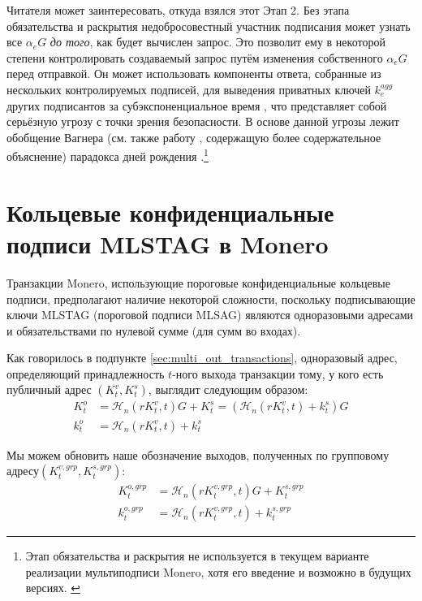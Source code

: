 Читателя может заинтересовать, откуда взялся этот Этап 2. Без этапа обязательства и раскрытия \cite{MRL-0009-multisig} недобросовестный участник подписания может узнать все $\alpha_e G$ {\em до того}, как будет вычислен запрос. Это позволит ему в некоторой степени контролировать создаваемый запрос путём изменения собственного $\alpha_e G$ перед отправкой. Он может использовать компо\-ненты ответа, собранные из нескольких контролируемых подписей, для выведения приватных ключей $k^{agg}_e$ других подписантов за субэкспоненциальное время \cite{cryptoeprint:2018:417}, что представляет собой серьёзную угрозу с точки зрения безопасности. В основе данной угрозы лежит обобщение Вагнера \cite{generalized-birthday-wagner} (см. также работу \cite{adam-wagnerian-tragedies}, содержащую более содержательное объяснение) пара\-докса дней рождения \cite{birthday-problem}.\footnote{Этап обязательства и раскрытия не используется в текущем варианте реализации мультиподписи Monero, хотя его введение и возможно в будущих версиях. \cite{multisig-research-issue-67}}



\section{Кольцевые конфиденциальные подписи MLSTAG в Monero}
\label{sec:MLSTAG-RingCT}

Транзакции Monero, использующие пороговые конфиденциальные кольцевые подписи, пред\-полагают наличие некоторой сложности, поскольку подписывающие ключи MLSTAG (поро\-говой подписи MLSAG) являются одноразовыми адресами и обязательствами по нулевой сумме (для сумм во входах).

Как говорилось в подпункте \ref{sec:multi_out_transactions}, одноразовый адрес, определяющий принадлежность $t$-ного выхода транзакции тому, у кого есть публичный адрес $(K^v_t,K^s_t)$, выглядит следующим образом:\vspace{.175cm}
\begin{align*}
  K_t^o &= \mathcal{H}_n(r K_t^v, t)G + K_t^s = (\mathcal{H}_n(r K_t^v, t) + k_t^s)G  \\ 
  k_t^o &= \mathcal{H}_n(r K_t^v, t) + k_t^s
\end{align*} 

Мы можем обновить наше обозначение выходов, полученных по групповому адресу\linebreak $(K^{v,grp}_t,K^{s,grp}_t)$:\vspace{.175cm}
\begin{align*}
  K^{o,grp}_t &= \mathcal{H}_n(r K^{v,grp}_t, t)G + K^{s,grp}_t  \\ 
  k^{o,grp}_t &= \mathcal{H}_n(r K^{v,grp}_t, t) + k^{s,grp}_t
\end{align*}

